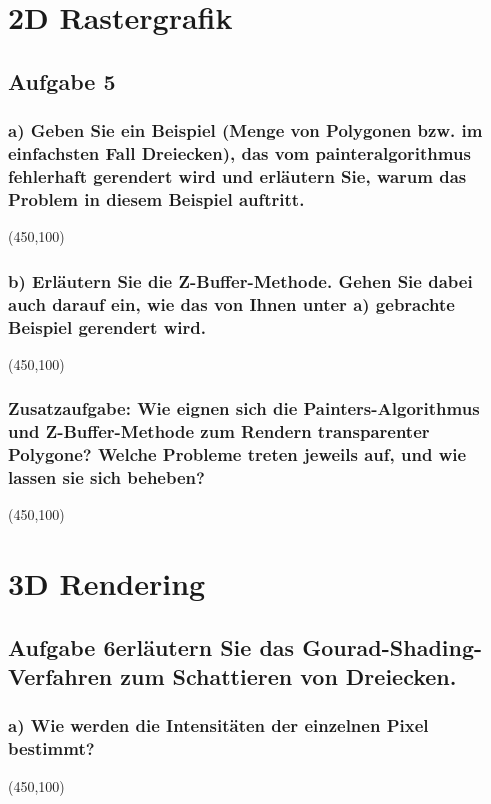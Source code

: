 \documentclass[10pt, a4paper]{article}
\begin{document}
\section{2D Rastergrafik}
\subsection{Aufgabe 5}
\subsubsection{a) Geben Sie ein Beispiel (Menge von Polygonen bzw. im einfachsten Fall Dreiecken), das vom painteralgorithmus fehlerhaft gerendert wird und erläutern Sie, warum das Problem in diesem Beispiel auftritt.}
\begin{center}
    \framebox(450,100){}
\end{center}
\subsubsection{b) Erläutern Sie die Z-Buffer-Methode. Gehen Sie dabei auch darauf ein, wie das von Ihnen unter a) gebrachte Beispiel gerendert wird.}
\begin{center}
    \framebox(450,100){}
\end{center}
\subsubsection{Zusatzaufgabe: Wie eignen sich die Painters-Algorithmus und Z-Buffer-Methode zum Rendern transparenter Polygone? Welche Probleme treten jeweils auf, und wie lassen sie sich beheben?}
\begin{center}
    \framebox(450,100){}
\end{center}

\section{3D Rendering}
\subsection{Aufgabe 6\newline erläutern Sie das Gourad-Shading-Verfahren zum Schattieren von Dreiecken.}
\subsubsection{a) Wie werden die Intensitäten der einzelnen Pixel bestimmt?}
\begin{center}
    \framebox(450,100){}
\end{center}
\end{document}
